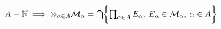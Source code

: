 \documentclass[[preview, border=10pt, 6pt]{standalone}
\begin{document}
$A\equiv\mathbb{N}\implies \otimes_{\alpha\in A}\mathcal{M}_\alpha = \bigcap \biggl\{{\prod_{\alpha\in A} E_\alpha,\: E_\alpha\in\mathcal{M}_\alpha,\: \alpha\in A}\biggr\}$
\end{document}
